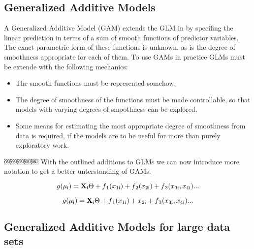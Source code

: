 \message{ !name(expose.tex)}\documentclass{article}
\begin{document}
    \subsection{Generalized Additive Models}
    A Generalized Additive Model (GAM) extends the GLM in by specifing the linear prediction in terms of a sum of smooth functions of predictor variables. The exact parametric form of these functions is unknown, as is the degree of smoothness appropriate for each of them. To use GAMs in practice GLMs must be extende with the following mechanics:
    \begin{itemize}
        \item The smooth functions must be represented somehow.
        \item The degree of smoothness of the functions must be made controllable, so that models with varying degrees of smoothness can be explored.
        \item Some means for estimating the most appropriate degree of smoothness from data is required, if the models are to be useful for more than purely exploratory work.
    \end{itemize}
￼￼￼￼￼
    With the outlined additions to GLMs we can now introduce more notation to get a better unterstanding of GAMs.

    \begin{equation} \label{GAM} g(\mu\textsubscript{i}) = \mathbf{X} \textsubscript{i} \Theta + f\textsubscript{1}(x\textsubscript{1i}) + f\textsubscript{2}(x\textsubscript{2i}) + f\textsubscript{3}(x\textsubscript{3i}, x\textsubscript{4i}) ... \end{equation}

    \begin{equation} \label{GAM2} g(\mu\textsubscript{i}) = \mathbf{X} \textsubscript{i} \Theta + f\textsubscript{1}(x\textsubscript{1i}) + x\textsubscript{2i} + f\textsubscript{3}(x\textsubscript{3i}, x\textsubscript{4i}) ... \end{equation}

    \subsection{Generalized Additive Models for large data sets}
    \cite{GAM}
\end{document}
